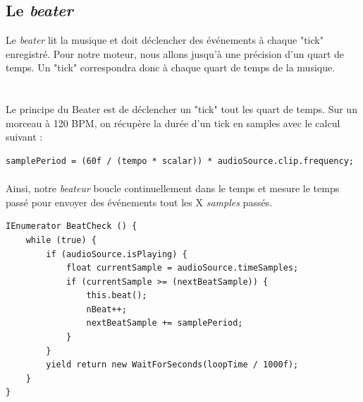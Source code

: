 \subsection{Le \textit{beater}}
Le \textit{beater} lit la musique et doit déclencher des événements à chaque "tick" enregistré. Pour notre moteur, nous allons jusqu'à une précision d'un quart de temps. Un "tick" correspondra donc à chaque quart de temps de la musique.\\

\\\\

Le principe du Beater est de déclencher un "tick" tout les quart de temps. Sur un morceau à 120 BPM, on récupère la durée d’un tick en samples avec le calcul suivant :

\begin{lstlisting}
samplePeriod = (60f / (tempo * scalar)) * audioSource.clip.frequency;
\end{lstlisting}

\paragraph{}

Ainsi, notre \textit{beateur} boucle continuellement dans le temps et mesure le temps passé pour envoyer des événements tout les X \textit{samples} passés.

\begin{lstlisting}
IEnumerator BeatCheck () {
    while (true) {
        if (audioSource.isPlaying) {
            float currentSample = audioSource.timeSamples;
            if (currentSample >= (nextBeatSample)) {
                this.beat();
                nBeat++;
                nextBeatSample += samplePeriod;
            }
        }
        yield return new WaitForSeconds(loopTime / 1000f);
    }
}
\end{lstlisting}


